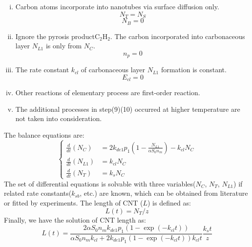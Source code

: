 \begin{enumerate}[(i)]
\item Carbon atoms incorporate into nanotubes via surface diﬀusion only.
$$N_{T}=N_{S}$$
$$N_{B}=0$$
\item Ignore the pyrosis product$\mathrm{C_{2}H_{2}}$. The carbon incorporated into carbonaceous layer $N_{L1}$ is only from $N_{C}$.
$$n_{p}=0$$
\item The rate constant $k_{cl}$ of carbonaceous layer $N_{L1}$ formation is constant.
$$E_{cl}=0$$
\item	Other  reactions of elementary process are first-order reaction.
\item   The additional processes in step(9)(10) occurred at higher temperature are not taken into consideration.
\end{enumerate}
The balance equations are:
\begin{equation}
\left\{\begin{array}{ll}
\frac{d}{d t}\left(N_{C}\right)&=2 k_{d e 1} p_{1}\left(1-\frac{N_{L1}}{\alpha S_{0} n_{m}}\right)-k_{c l} N_{C} 
\\
\frac{d}{d t}\left(N_{L1}\right)&=k_{c l} N_{C}
\\
\frac{d}{d t}\left(N_{T}\right)&=k_{s} N_{C} 
\end{array}\right.
\tag{3.2.15}
\end{equation}
The set of differential equations is solvable with three variables($N_{C}$, $N_{T}$, $N_{L1}$) if related rate constants($k_{sb}$, etc.) are known, which can be obtained from literature or fitted by experiments. 
The length of CNT ($L$) is defined as:
\begin{equation}
L(t)=N_{T} / z
\tag{3.2.16}
\end{equation}
Finally, we have the solution of CNT length as:
\begin{equation}
L(t)=\frac{2 \alpha S_{0} n_{m} k_{d e 1} p_{1}\left(1-\exp \left(-k_{c l} t\right)\right)}{\alpha S_{0} n_{m} k_{c l}+2 k_{d e 1} p_{1}\left(1-\exp \left(-k_{c l} t\right)\right) k_{c l} t} \frac{k_{s} t}{z}
\tag{3.2.17}
\end{equation}

